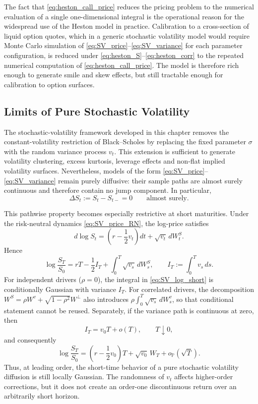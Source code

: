 \begin{remark}
The fact that \eqref{eq:heston_call_price} reduces the pricing problem
to the numerical evaluation of a single one-dimensional integral is the
operational reason for the widespread use of the Heston model in
practice. Calibration to a cross-section of liquid option quotes, which
in a generic stochastic volatility model would require Monte Carlo
simulation of \eqref{eq:SV_price}--\eqref{eq:SV_variance} for each
parameter configuration, is reduced under
\eqref{eq:heston_S}--\eqref{eq:heston_corr} to the repeated numerical
computation of \eqref{eq:heston_call_price}. The model is therefore rich
enough to generate smile and skew effects, but still tractable enough
for calibration to option surfaces.
\end{remark}
\subsection{Limits of Pure Stochastic Volatility}\label{sec:sv-limits}


The stochastic-volatility framework developed in this chapter removes the
constant-volatility restriction of Black--Scholes by replacing the fixed
parameter $\sigma$ with the random variance process $v_t$.  This
extension is sufficient to generate volatility clustering, excess
kurtosis, leverage effects and non-flat implied volatility surfaces.
Nevertheless, models of the form
\eqref{eq:SV_price}--\eqref{eq:SV_variance} remain purely diffusive:
their sample paths are almost surely continuous and therefore contain no
jump component.  In particular,
\begin{equation}\label{eq:SV_no_jump}
\Delta S_t:=S_t-S_{t-}=0
\qquad\text{almost surely}.
\end{equation}

This pathwise property becomes especially restrictive at short
maturities.  Under the risk-neutral dynamics
\eqref{eq:SV_price_RN}, the log-price satisfies
\[
d\log S_t
=
\left(r-\frac12 v_t\right)dt+\sqrt{v_t}\,dW^S_t.
\]
Hence
\begin{equation}\label{eq:SV_log_short}
\log\frac{S_T}{S_0}
=
rT-\frac12 I_T
+
\int_0^T \sqrt{v_s}\,dW^S_s,
\qquad
I_T:=\int_0^T v_s\,ds.
\end{equation}
For independent drivers ($\rho=0$), the integral in
\eqref{eq:SV_log_short} is conditionally Gaussian with variance
$I_T$. For correlated drivers, the decomposition
$W^S=\rho W^v+\sqrt{1-\rho^2}W^\perp$ also introduces
$\rho\int_0^T\sqrt{v_s}\,dW_s^v$, so that conditional statement
cannot be reused. Separately, if the variance path is continuous at zero, then
\[
I_T=v_0T+o(T),
\qquad T\downarrow 0,
\]
and consequently
\begin{equation}
\log\frac{S_T}{S_0}
=
\left(r-\frac12 v_0\right)T
+
\sqrt{v_0}\,W_T
+
o_{\mathbb{P}}(\sqrt{T}).
\end{equation}
Thus, at leading order, the short-time behavior of a pure stochastic
volatility diffusion is still locally Gaussian.  The randomness of
$v_t$ affects higher-order corrections, but it does not create an
order-one discontinuous return over an arbitrarily short horizon.

